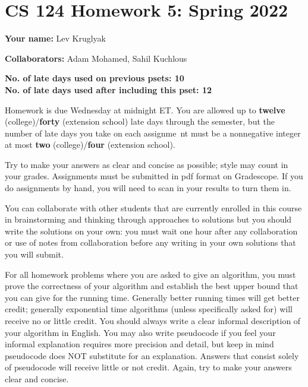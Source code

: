 \documentclass[11pt,letterpaper]{article}
\begin{document}
\section*{CS 124 Homework 5: Spring 2022}

\textbf{Your name:} Lev Kruglyak

\textbf{Collaborators:} Adam Mohamed, Sahil Kuchlous

\textbf{No. of late days used on previous psets: 10}\\
\textbf{No. of late days used after including this pset: 12}

Homework is due Wednesday at midnight ET. You are allowed up to {\bf twelve} (college)/{\bf forty} (extension school) late days through the semester, but the number of late days you take on each assignme\
nt must be a nonnegative integer at most {\bf two} (college)/{\bf four} (extension school).

Try to make your answers as clear and concise as possible;
style may count in your grades. Assignments must be submitted in pdf format on Gradescope. If you do assignments by hand, you will need to scan in your results to turn them in.

You can collaborate with other students that are currently enrolled in this
course in brainstorming and thinking through approaches to solutions but you should write
the solutions on your own: you must wait one hour after any collaboration or use of notes
from collaboration before any writing in your own solutions that you will submit. 

For all homework problems where you are asked to give an algorithm, you must prove the correctness
of your algorithm and establish the best upper bound that you can give for the running time. Generally
better running times will get better credit; generally exponential time algorithms (unless specifically asked
for) will receive no or little credit. You should always write a clear informal description of your algorithm
in English. You may also write pseudocode if you feel your informal explanation requires more precision
and detail, but keep in mind pseudocode does NOT substitute for an explanation. Answers that consist
solely of pseudocode will receive little or not credit. Again, try to make your answers clear and concise.
\end{document}
